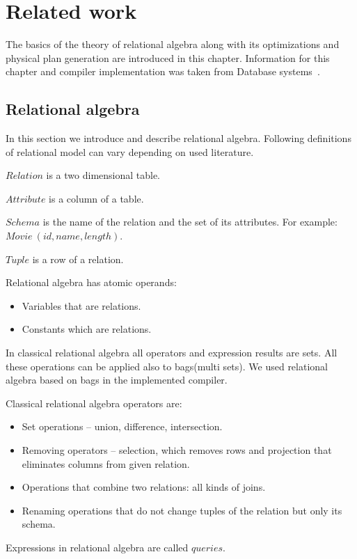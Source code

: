 \chapter{Related work}
\label{relatedwork}
The basics of the theory of relational algebra along with its optimizations and physical plan generation are introduced in this chapter. Information for this chapter and compiler implementation was taken from Database systems~\cite{database}.
\section{Relational algebra}

In this section we introduce and describe relational algebra\cite{database}. Following definitions of relational model can vary depending on used literature.
\begin{mydef}
$Relation$ is a two dimensional table.
\end{mydef}
\begin{mydef}
$Attribute$ is a column of a table.
\end{mydef}
\begin{mydef}
$Schema$ is the name of the relation and the set of its attributes. For example:~$Movie~(id,name,length)$.
\end{mydef}
\begin{mydef}
$Tuple$ is a row of a relation.
\end{mydef}

Relational algebra has atomic operands:
\begin{itemize}
\item Variables that are relations.
\item Constants which are relations. 
\end{itemize}

In classical relational algebra all operators and expression results are sets. All these operations can be applied also to bags(multi sets). We used relational algebra based on bags in the implemented compiler.

Classical relational algebra operators are:
\begin{itemize}
\item Set operations -- union, difference, intersection.
\item Removing operators -- selection, which removes rows and projection that eliminates columns from given relation.
\item Operations that combine two relations: all kinds of joins.
\item Renaming operations that do not change tuples of the relation but only its schema.
\end{itemize}
Expressions in relational algebra are called $queries$.
